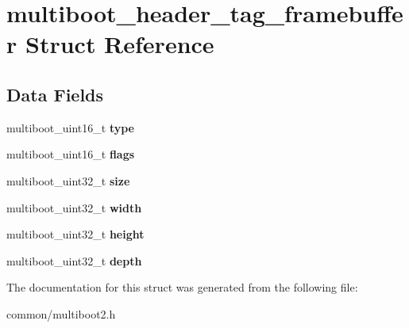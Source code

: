 \hypertarget{structmultiboot__header__tag__framebuffer}{}\section{multiboot\+\_\+header\+\_\+tag\+\_\+framebuffer Struct Reference}
\label{structmultiboot__header__tag__framebuffer}
\subsection*{Data Fields}
\begin{DoxyCompactItemize}
\item 
multiboot\+\_\+uint16\+\_\+t {\bfseries type}\hypertarget{structmultiboot__header__tag__framebuffer_a7e0e5bc5d225f414b9b3adcc0f65877d}{}\label{structmultiboot__header__tag__framebuffer_a7e0e5bc5d225f414b9b3adcc0f65877d}

\item 
multiboot\+\_\+uint16\+\_\+t {\bfseries flags}\hypertarget{structmultiboot__header__tag__framebuffer_ae661e90a975d987d415c747de7e146e4}{}\label{structmultiboot__header__tag__framebuffer_ae661e90a975d987d415c747de7e146e4}

\item 
multiboot\+\_\+uint32\+\_\+t {\bfseries size}\hypertarget{structmultiboot__header__tag__framebuffer_a5f362805d0e7fa1c771028c37fc938e7}{}\label{structmultiboot__header__tag__framebuffer_a5f362805d0e7fa1c771028c37fc938e7}

\item 
multiboot\+\_\+uint32\+\_\+t {\bfseries width}\hypertarget{structmultiboot__header__tag__framebuffer_a01f7fd9c4cbb8d58b155a50ff0e030d0}{}\label{structmultiboot__header__tag__framebuffer_a01f7fd9c4cbb8d58b155a50ff0e030d0}

\item 
multiboot\+\_\+uint32\+\_\+t {\bfseries height}\hypertarget{structmultiboot__header__tag__framebuffer_acfaa9a5efd3ee21247061fdafafafee6}{}\label{structmultiboot__header__tag__framebuffer_acfaa9a5efd3ee21247061fdafafafee6}

\item 
multiboot\+\_\+uint32\+\_\+t {\bfseries depth}\hypertarget{structmultiboot__header__tag__framebuffer_a0d19797e8a049353c2ba98e04df089bc}{}\label{structmultiboot__header__tag__framebuffer_a0d19797e8a049353c2ba98e04df089bc}

\end{DoxyCompactItemize}


The documentation for this struct was generated from the following file\+:\begin{DoxyCompactItemize}
\item 
common/multiboot2.\+h\end{DoxyCompactItemize}

